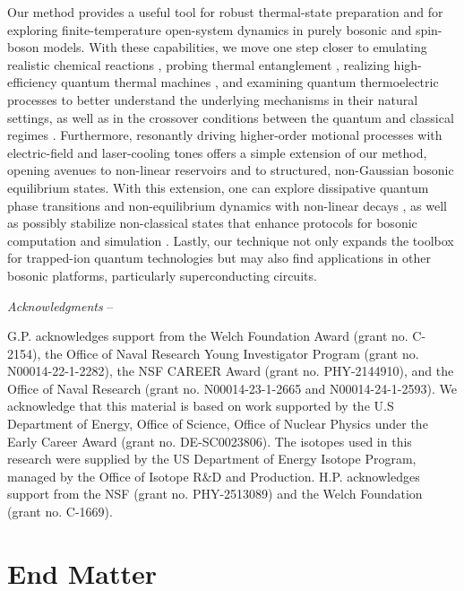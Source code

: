 \documentclass[
reprint,
superscriptaddress,

amsmath,amssymb,
aps,
prl,

floatfix,
]{revtex4-2}
\begin{document}
Our method provides a useful tool for robust thermal-state preparation and for exploring finite-temperature open-system dynamics in purely bosonic and spin-boson models. With these capabilities, we move one step closer to emulating realistic chemical reactions \cite{marcus1993electron,olaya-agudelo2025open}, probing thermal entanglement \cite{valido2013gaussian,chanda2018entanglement}, realizing high-efficiency quantum thermal machines \cite{rossnagel2016engine,maslennikov2019fridge}, and examining quantum thermoelectric processes \cite{roy2010thermoelectric,tejero2025asym} to better understand the underlying mechanisms in their natural settings, as well as in the crossover conditions between the quantum and classical regimes \cite{barbara1996et}. Furthermore, resonantly driving higher-order motional processes with electric-field and laser-cooling tones offers a simple extension of our method, opening avenues to non-linear reservoirs and to structured, non-Gaussian bosonic equilibrium states. With this extension, one can explore dissipative quantum phase transitions and non-equilibrium dynamics with non-linear decays \cite{shah2024dissipative,mylnikov2025twophonon,liu2025observationsynchronizationquantumvan}, as well as possibly stabilize non-classical states that enhance protocols for bosonic computation and simulation \cite{rojkov2024stabilizationcatstatemanifoldsusing,matsos2024gkp}. Lastly, our technique not only expands the toolbox for trapped-ion quantum technologies but may also find applications in other bosonic platforms, particularly superconducting circuits.

\emph{Acknowledgments} --

G.P. acknowledges support from the Welch Foundation Award (grant no. C-2154), the Office of Naval Research Young Investigator Program (grant no. N00014-22-1-2282), the NSF CAREER Award (grant no. PHY-2144910), and the Office of Naval Research (grant no. N00014-23-1-2665 and N00014-24-1-2593). We acknowledge that this material is based on work supported by the U.S Department of Energy, Office of Science, Office of Nuclear Physics under the Early Career Award (grant no. DE-SC0023806). The isotopes used in this research were supplied by the US Department of Energy Isotope Program, managed by the Office of Isotope R$\&$D and Production. H.P. acknowledges support from the NSF (grant no. PHY-2513089) and the Welch Foundation (grant no. C-1669).




\section*{End Matter}
\label{sec:end_matter}
\end{document}
